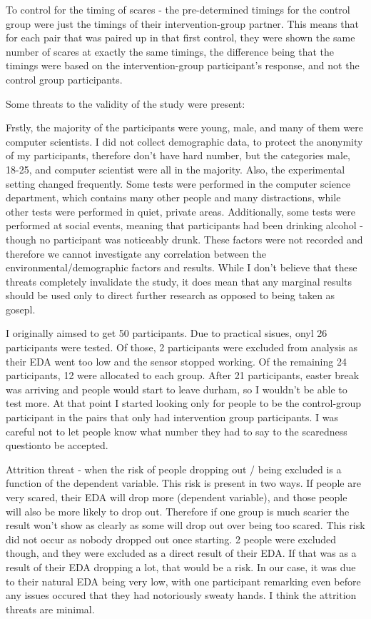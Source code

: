 \documentclass[12pt,a4paper]{article}\usepackage[]{graphicx}\usepackage[]{color}
\begin{document}
To control for the timing of scares - the pre-determined timings for the control group were just the timings of their intervention-group partner.
This means that for each pair that was paired up in that first control, they were shown the same number of scares at exactly the same timings, the difference being that the timings were based on the intervention-group participant's response, and not the control group participants.

Some threats to the validity of the study were present:

Frstly, the majority of the participants were young, male, and many of them were computer scientists.
I did not collect demographic data, to protect the anonymity of my participants, therefore don't have hard number, but the categories male, 18-25, and computer scientist were all in the majority.
Also, the experimental setting changed frequently.
Some tests were performed in the computer science department, which contains many other people and many distractions, while other tests were performed in quiet, private areas.
Additionally, some tests were performed at social events, meaning that participants had been drinking alcohol - though no participant was noticeably drunk.
These factors were not recorded and therefore we cannot investigate any correlation between the environmental/demographic factors and results.
While I don't believe that these threats completely invalidate the study, it does mean that any marginal results should be used only to direct further research as opposed to being taken as gosepl.

I originally aimsed to get 50 participants. Due to practical sisues, onyl 26 participants were tested. Of those, 2 participants were excluded from analysis as their EDA went too low and the sensor stopped working. Of the remaining 24 participants, 12 were allocated to each group. After 21 participants, easter break was arriving and people would start to leave durham, so I wouldn't be able to test more. At that point I started looking only for people to be the control-group participant in the pairs that only had intervention group participants. I was careful not to let people know what number they had to say to the scaredness questionto be accepted.

Attrition threat - when the risk of people dropping out / being excluded is a function of the dependent variable. This risk is present in two ways. If people are very scared, their EDA will drop more (dependent variable), and those people will also be more likely to drop out. Therefore if one group is much scarier the result won't show as clearly as some will drop out over being too scared. This risk did not occur as nobody dropped out once starting. 2 people were excluded though, and they were excluded as a direct result of their EDA. If that was as a result of their EDA dropping a lot, that would be a risk. In our case, it was due to their natural EDA being very low, with one participant remarking even before any issues occured that they had notoriously sweaty hands. I think the attrition threats are minimal.
\end{document}
